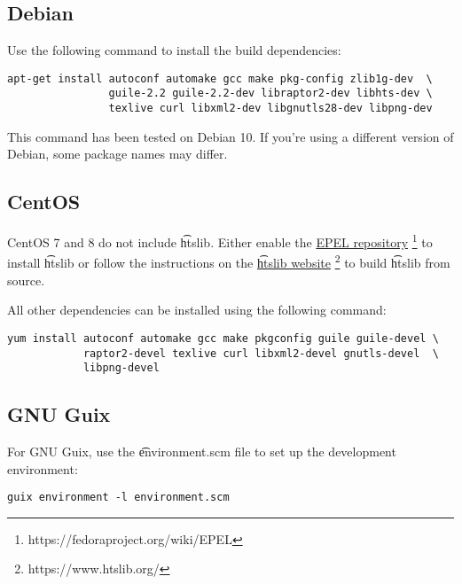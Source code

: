 \subsection{Debian}

  Use the following command to install the build dependencies:

\begin{siderules}
\begin{verbatim}
apt-get install autoconf automake gcc make pkg-config zlib1g-dev  \
                guile-2.2 guile-2.2-dev libraptor2-dev libhts-dev \
                texlive curl libxml2-dev libgnutls28-dev libpng-dev
\end{verbatim}
\end{siderules}

  This command has been tested on Debian 10.  If you're using a different
  version of Debian, some package names may differ.

\subsection{CentOS}

  CentOS 7 and 8 do not include \t{htslib}.  Either enable the
  \href{https://fedoraproject.org/wiki/EPEL}{EPEL repository}%
  \footnote{https://fedoraproject.org/wiki/EPEL}
  to install \t{htslib} or follow the instructions on the
  \href{https://www.htslib.org/}{\t{htslib} website}%
  \footnote{https://www.htslib.org/} to build \t{htslib} from source.

  All other dependencies can be installed using the following command:

\begin{siderules}
\begin{verbatim}
yum install autoconf automake gcc make pkgconfig guile guile-devel \
            raptor2-devel texlive curl libxml2-devel gnutls-devel  \
            libpng-devel
\end{verbatim}
\end{siderules}

\subsection{GNU Guix}

  For GNU Guix, use the \t{environment.scm} file to set up the development
  environment:

\begin{siderules}
\begin{verbatim}
guix environment -l environment.scm
\end{verbatim}
\end{siderules}

